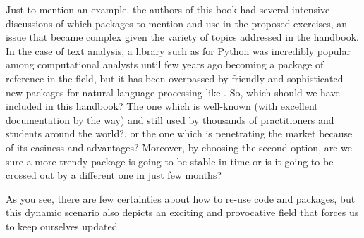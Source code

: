 Just to mention an example, the authors of this book had several intensive discussions of which packages to mention and use in the proposed exercises, an issue that became complex given the variety of topics addressed in the handbook. In the case of text analysis, a library such as  for Python was incredibly popular among computational analysts until few years ago becoming a package of reference in the field, but it has been overpassed by friendly and sophisticated new packages for natural language processing like . So, which should we have included in this handbook? The one which is well-known (with excellent documentation by the way) and still used by thousands of practitioners and students around the world?, or the one which is penetrating the market because of its easiness and advantages? Moreover, by choosing the second option, are we sure a more trendy package is going to be stable in time or is it going to be crossed out by a different one in just few months?  

As you see, there are few certainties about how to re-use code and packages, but this dynamic scenario also depicts an exciting and provocative field that forces us to keep ourselves updated.
